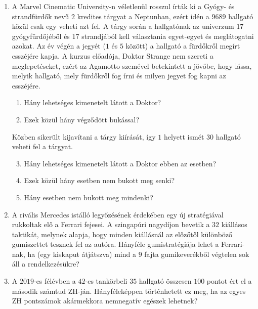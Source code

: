 \documentclass[a4paper,12pt]{article}
\begin{document}
    \noindent{}
    \noindent{}
    \begin{enumerate}
        \item A Marvel Cinematic University-n véletlenül rosszul írták ki a Gyógy- és strandfürdők nevű $2$ kredites tárgyat a Neptunban, ezért idén a $9689$ hallgató közül csak egy veheti azt fel. A tárgy során a hallgatónak az univerzum $17$ gyógyfürdőjéből és $17$ strandjából kell választania egyet-egyet és meglátogatni azokat. Az év végén a jegyét ($1$ és $5$ között) a hallgató a fürdőkről megírt esszéjére kapja. A kurzus előadója, Doktor Strange nem szereti a meglepetéseket, ezért az Agamotto szemével betekintett a jövőbe, hogy lássa, melyik hallgató, mely fürdőkről fog írni és milyen jegyet fog kapni az esszéjére.
        \begin{enumerate}
            \item Hány lehetséges kimenetelt látott a Doktor?
            \item Ezek közül hány végződött bukással?
        \end{enumerate}
        Közben sikerült kijavítani a tárgy kiírását, így $1$ helyett ismét $30$ hallgató veheti fel a tárgyat.
        \begin{enumerate}
            \setcounter{enumii}{2}
            \item Hány lehetséges kimenetelt látott a Doktor ebben az esetben?
            \item Ezek közül hány esetben nem bukott meg senki?
            \item Hány esetben nem bukott meg mindenki?
        \end{enumerate}

        \item A rivális Mercedes istálló legyőzésének érdekében egy új stratégiával rukkoltak elő a Ferrari fejesei. A szingapúri nagydíjon bevetik a $32$ kiállásos taktikát, melynek alapja, hogy minden kiállásnál az előzőtől különböző gumiszettet tesznek fel az autóra. Hányféle gumistratégiája lehet a Ferrari-nak, ha (egy kiskaput átjátszva) mind a $9$ fajta gumikeverékből végtelen sok áll a rendelkezésükre?
        
        \item A $2019$-es félévben a $42$-es tankörbeli $35$ hallgató összesen $100$ pontot ért el a második számtud ZH-ján. Hányféleképpen történhetett ez meg, ha az egyes ZH pontszámok akármekkora nemnegatív egészek lehetnek?
        

\end{enumerate}
\end{document}
